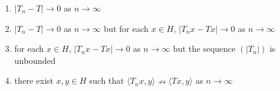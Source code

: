 \documentclass{article}
\newcommand{\brak}[1]{\left( #1 \right)}
\newcommand{\abs}[1]{\left| #1 \right|}
\begin{document}
\begin{enumerate}
\begin{enumerate}
    \item $\abs{T_n - T} \to 0$ as $n \to \infty$
    \item $\abs{T_n - T} \to 0$ as $n \to \infty$ but for each $x \in H$, $\abs{T_n x - T x} \to 0$ as $n \to \infty$
    \item for each $x \in H$, $\abs{T_n x - T x} \to 0$ as $n \to \infty$ but the sequence $\brak{\abs{T_n}}$ is unbounded
    \item there exist $x, y \in H$ such that $\langle T_n x, y \rangle \nrightarrow \langle T x, y \rangle$ as $n \to \infty$
\end{enumerate}

\end{enumerate}
\end{document}
